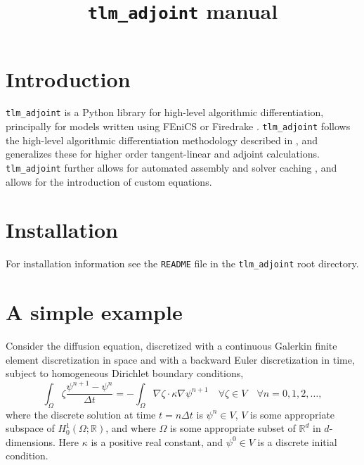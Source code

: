\documentclass[11pt]{article}
\title{\texttt{tlm\_adjoint} manual}
\begin{document}
\maketitle

\tableofcontents

\section{Introduction}

\texttt{tlm\_adjoint} \citep{maddison2019} is a Python library for high-level
algorithmic differentiation, principally for models written using FEniCS
\citep{logg2012,alnaes2015} or Firedrake \citep{rathgeber2016}.
\texttt{tlm\_adjoint} follows the high-level algorithmic differentiation
methodology described in \citet{farrell2013}, and generalizes these for higher
order tangent-linear and adjoint calculations. \texttt{tlm\_adjoint} further
allows for automated assembly and solver caching \citep[see][]{maddison2014},
and allows for the introduction of custom equations.

\section{Installation}

For installation information see the \texttt{README} file in the
\texttt{tlm\_adjoint} root directory.

\section{A simple example}\label{sect:diffusion}

Consider the diffusion equation, discretized with a continuous Galerkin finite
element discretization in space and with a backward Euler discretization in
time, subject to homogeneous Dirichlet boundary conditions,
\begin{equation*}
  \int_\Omega \zeta \frac{\psi^{n + 1} - \psi^n}{\Delta t}
    = -\int_\Omega \nabla \zeta \cdot \kappa \nabla \psi^{n + 1}
    \quad \forall \zeta \in V \quad \forall n = 0, 1, 2, \ldots,
\end{equation*}
where the discrete solution at time $t = n \Delta t$ is $\psi^n \in V$, $V$ is
some appropriate subspace of $H^1_0 \left( \Omega; \mathbb{R} \right)$, and
where $\Omega$ is some appropriate subset of $\mathbb{R}^d$ in $d$-dimensions.
Here $\kappa$ is a positive real constant, and $\psi^0 \in V$ is a discrete
initial condition.
\end{document}

